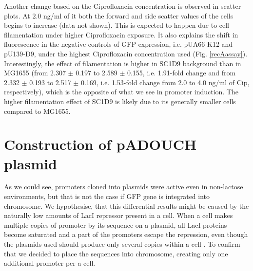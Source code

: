 Another change based on the Ciprofloxacin concentration is observed in scatter plots.
At 2.0 ng/ml of it both the forward and side scatter values of the cells begins to increase (data not shown).
This is expected to happen due to cell filamentation under higher Ciprofloxacin exposure.
It also explains the shift in fluorescence in the negative controls of GFP expression, i.e. pUA66-K12 and pU139-D9, under the highest Ciprofloxacin concentration used (Fig. \ref{recAassay}).
Interestingly, the effect of filamentation is higher in SC1\textunderscore D9 background than in MG1655 (from 2.307 $\pm$ 0.197 to 2.589 $\pm$ 0.155, i.e. 1.91-fold change and from 2.332 $\pm$ 0.193 to 2.517 $\pm$ 0.169, i.e. 1.53-fold change from 2.0 to 4.0 ng/ml of Cip, respectively), which is the opposite of what we see in  promoter induction.
The higher filamentation effect of SC1\textunderscore D9 is likely due to its generally smaller cells compared to MG1655.


\section{Construction of pADOUCH plasmid}
As we could see,  promoters cloned into plasmids were active even in non-lactose environments, but that is not the case if GFP gene is integrated into chromosome.
We hypothesise, that this differential results might be caused by the naturally low amounts of LacI repressor present in a cell.
When a cell makes multiple copies of  promoter by its sequence on a plasmid, all LacI proteins become saturated and a part of the promoters escape the repression, even though the plasmids used should produce only several copies within a cell \cite{zaslaver2006comprehensive}.
To confirm that we decided to place the  sequences into chromosome, creating only one additional  promoter per a cell.

